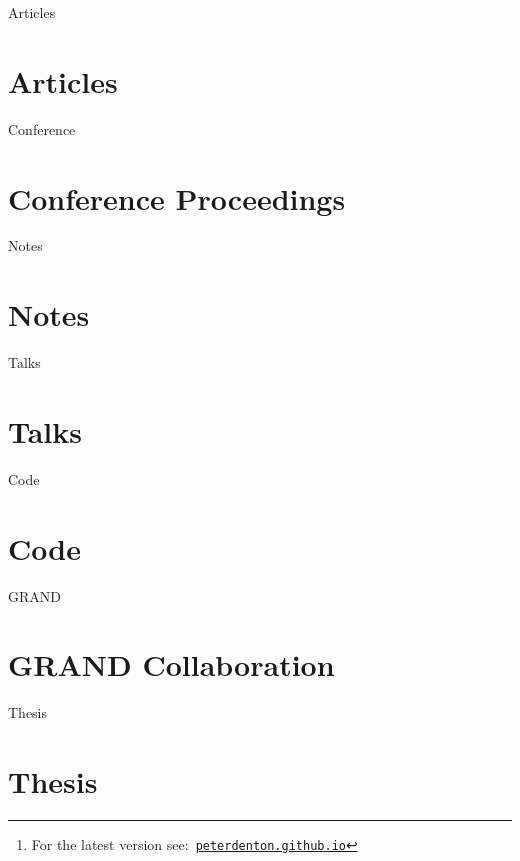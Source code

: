 \documentclass[12pt]{article}
\title{\myTitle}
\author{\myName}
\date{\small Updated: \today\footnote{For the latest version see:\ \href{http://peterdenton.github.io}{\tt peterdenton.github.io}}}
\newcommand\myBib[2]{
\begin{btSect}{#2}
\section*{#1}
\btPrintAll
\end{btSect}}
\begin{document}
\makeatletter
\let\@fnsymbol\@arabic
\makeatother

\maketitle



\myBib{Articles}{Articles}
\myBib{Conference Proceedings}{Conference}
\myBib{Notes}{Notes}
\myBib{Talks}{Talks}
\myBib{Code}{Code}
\myBib{GRAND Collaboration}{GRAND}
\myBib{Thesis}{Thesis}
\end{document}
